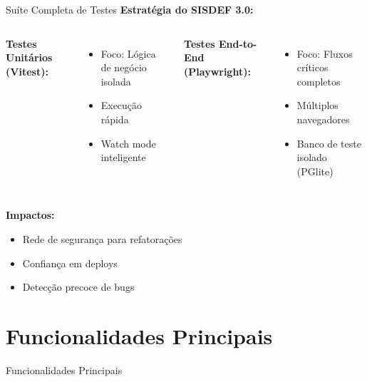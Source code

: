 \documentclass[aspectratio=169,xcolor=table]{beamer}
\begin{document}
\begin{frame}{Suíte Completa de Testes}
    \textbf{Estratégia do SISDEF 3.0:}
    
    \begin{columns}[T]
        \textbf{Testes Unitários (Vitest):}
        \begin{itemize}
            \item Foco: Lógica de negócio isolada
            \item Execução rápida
            \item Watch mode inteligente
        \end{itemize}
        
        \textbf{Testes End-to-End (Playwright):}
        \begin{itemize}
            \item Foco: Fluxos críticos completos
            \item Múltiplos navegadores
            \item Banco de teste isolado (PGlite)
        \end{itemize}
    \end{columns}
    
    \vspace{0.5em}
    \textbf{Impactos:}
    \begin{itemize}
        \item  Rede de segurança para refatorações
        \item  Confiança em deploys
        \item  Detecção precoce de bugs
    \end{itemize}
\end{frame}

\section{Funcionalidades Principais}

\begin{frame}[plain]
    \begin{center}
        \Huge Funcionalidades Principais
    \end{center}
\end{frame}
\end{document}
